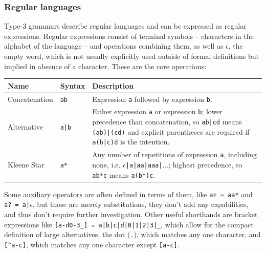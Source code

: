 			\subsubsection{Regular languages}
			
			Type-3 grammars describe regular languages and can be expressed as regular expressions. Regular expressions consist of terminal symbols -- characters in the alphabet of the language -- and operations combining them, as well as $\epsilon$, the empty word, which is not usually explicitly used outside of formal definitions but implied in absence of a character. These are the core operations:
			
			
			\begin{center}
			\begin{tabular}{ l l p{10cm} }
			\toprule
			Name         & Syntax & Description \\
			\midrule
			Concatenation & \lstinline$ab$  & Expression \lstinline$a$ followed by expression \lstinline$b$. \\
			Alternative   & \lstinline$a|b$ & Either expression \lstinline$a$ or expression \lstinline$b$; lower precedence than concatenation, so \lstinline$ab|cd$ means \lstinline$(ab)|(cd)$ and explicit parentheses are required if \lstinline$a(b|c)d$ is the intention. \\
			Kleene Star   & \lstinline$a*$  & Any number of repetitions of expression \lstinline$a$, including none, i.e. $\epsilon$\lstinline$|a|aa|aaa|$$\ldots$; highest precedence, so \lstinline$ab*c$ means \lstinline$a(b*)c$. \\
			\bottomrule
			\end{tabular}
			\end{center}
			
			Some auxiliary operators are often defined in terms of them, like \lstinline$a+ = aa*$ and \lstinline$a? = a|$$\epsilon$, but those are merely substitutions, they don't add any capabilities, and thus don't require further investigation. Other useful shorthands are bracket expressions like \lstinline$[a-d0-3_] = a|b|c|d|0|1|2|3|_$, which allow for the compact definition of large alternatives, the dot (\lstinline$.$), which matches any one character, and \lstinline$[^a-c]$, which matches any one character except \lstinline$[a-c]$.
			
